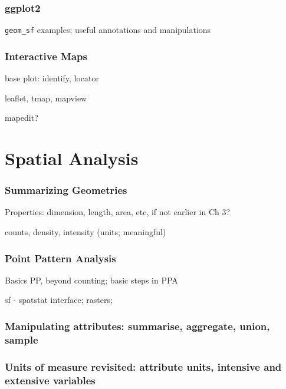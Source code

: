 \documentclass[]{krantz}
\theoremstyle{definition}
\theoremstyle{definition}
\theoremstyle{definition}
\theoremstyle{remark}
\begin{document}
\section{ggplot2}\label{ggplot2}

\texttt{geom\_sf} examples; useful annotations and manipulations

\section{Interactive Maps}\label{interactive-maps}

base plot: identify, locator

leaflet, tmap, mapview

mapedit?

\part{Spatial Analysis}\label{part-spatial-analysis}

\section{Summarizing Geometries}\label{summarizing-geometries}

Properties: dimension, length, area, etc, if not earlier in Ch 3?

counts, density, intensity (units; meaningful)

\section{Point Pattern Analysis}\label{point-pattern-analysis}

Basics PP, beyond counting; basic steps in PPA

sf - spatstat interface; rasters;

\section{Manipulating attributes: summarise, aggregate, union,
sample}\label{manipulating-attributes-summarise-aggregate-union-sample}

\section{Units of measure revisited: attribute units, intensive and
extensive
variables}\label{units-of-measure-revisited-attribute-units-intensive-and-extensive-variables}
\end{document}
